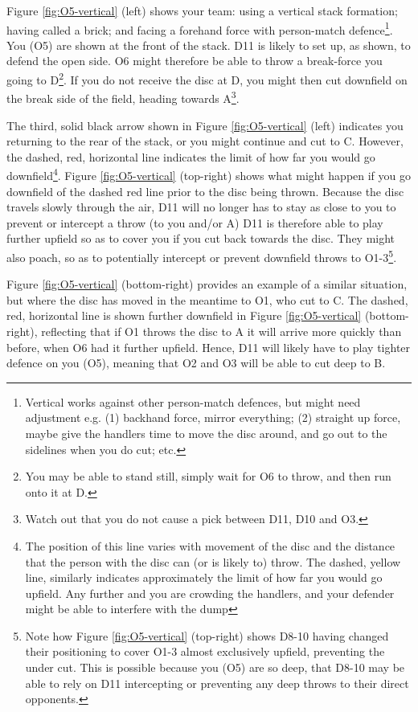 \documentclass{tufte-handout}
\begin{document}
Figure \ref{fig:O5-vertical} (left) shows 
your team: 
using 
a vertical stack formation; 
having called a brick; and
facing a 
forehand force with 
person-match defence\footnote{
Vertical works
against other person-match defences, 
but might need 
adjustment e.g. 
(1) backhand force,
mirror everything;
(2) straight up force, 
maybe give the handlers 
time to move the disc around, 
and go out to the sidelines
when you do cut; etc.}. 
You (O5) 
are shown 
at the front 
of the stack.
D11 
is likely to set up, 
as shown, 
to defend the open side. 
O6 might
therefore be 
able to 
throw a break-force 
you going to D\footnote{
You may
be able to stand still, 
simply wait for O6 
to throw, 
and then run onto 
it at D.}.
If you do not 
receive the disc 
at D, 
you might then 
cut downfield 
on the break side 
of the field, 
heading towards 
A\footnote{
Watch out that you 
do not cause a pick 
between D11, 
D10 and O3.}.  

The third, 
solid black arrow
shown in 
Figure \ref{fig:O5-vertical} (left) 
indicates you 
returning to 
the rear of the stack, 
or you might continue 
and cut to C. 
However, the dashed, 
red, 
horizontal line 
indicates the limit 
of how far you 
would go downfield\footnote{
The position of 
this line 
varies with movement 
of the disc and the distance 
that the person with the disc 
can (or is likely to) throw.
The dashed, 
yellow line, 
similarly indicates 
approximately the
limit of how far you 
would go upfield.  
Any further and
you are crowding the handlers, 
and your defender 
might be able to interfere 
with the dump}. 
Figure \ref{fig:O5-vertical} (top-right) shows 
what might happen 
if you go downfield of
the dashed red line 
prior to the disc being thrown. 
Because the disc travels slowly 
through the air, 
D11 will no longer has to stay as close to you 
to prevent or intercept a throw 
(to you and/or A)
D11 is therefore able to play 
further upfield 
so as to 
cover you if you 
cut back towards 
the disc. 
They might also 
poach, so as to 
potentially intercept
or prevent 
downfield throws 
to O1-3\footnote{
Note how Figure \ref{fig:O5-vertical} (top-right)  
shows D8-10 
having changed their 
positioning 
to cover O1-3
almost exclusively upfield, 
preventing the under cut.  
This is possible because you (O5) 
are so deep, 
that D8-10 may be 
able to rely on 
D11 intercepting 
or preventing any deep throws 
to their direct opponents.}. 

Figure \ref{fig:O5-vertical} (bottom-right)  
provides an example 
of a similar situation, but 
where the disc has moved 
in the meantime to O1, 
who cut to C.  
The dashed,
red,
horizontal line 
is shown 
further downfield in 
Figure \ref{fig:O5-vertical} (bottom-right), 
reflecting that if O1 
throws the disc to 
A it will arrive 
more quickly than before, 
when O6 had it further upfield. 
Hence, D11 will likely 
have to play tighter defence 
on you (O5), 
meaning that O2 and O3 
will be able to cut deep to B.
\end{document}
